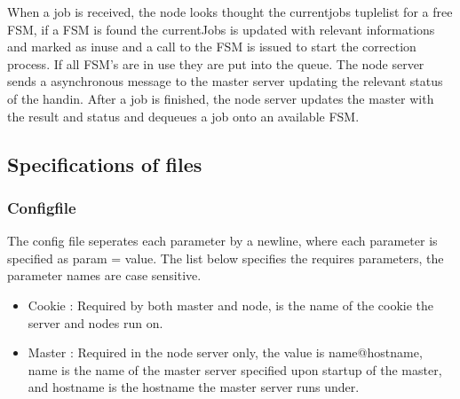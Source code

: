 When a job is received, the node looks thought the currentjobs tuplelist for a free FSM, if a FSM is found the currentJobs is updated with relevant informations and marked as inuse and a call to the FSM is issued to start the correction process. If all FSM's are in use they are put into the queue. The node server sends a asynchronous message to the master server updating the relevant status of the handin. After a job is finished, the node server updates the master with the result and status and dequeues a job onto an available FSM.
\subsection{Specifications of files}
\subsubsection{Configfile}
\label{sec:config}
The config file seperates each parameter by a newline, where each parameter is specified as param = value.
The list below specifies the requires parameters, the parameter names are case sensitive.
\begin{itemize}
    \item Cookie : Required by both master and node, is the name of the cookie the server and nodes run on.
    \item Master : Required in the node server only, the value is name@hostname, name is the name of the master server specified upon startup of the master, and hostname is the hostname the master server runs under.
\end{itemize}

